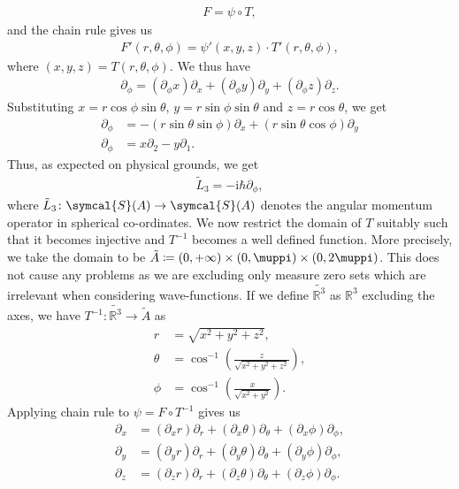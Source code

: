 \documentclass[12pt, a4 paper]{article}
\theoremstyle{definition}
\newcommand{\rthree}{\mathbb{R}^3}
\newcommand{\schwartz}{\symcal{S}}
\renewcommand{\i}{\mathrm{i}}
\renewcommand{\pi}{\muppi}
\begin{document}
	\begin{align*}
		F = \psi \circ T,
	\end{align*}
	and the chain rule gives us
	\begin{align*}
	    F'(r, \theta, \phi) = \psi'(x,y,z) \cdot T'(r, \theta, \phi),
	\end{align*}
	where $(x,y,z) = T(r, \theta, \phi)$. We thus have
	\begin{align*}
	    \partial_\phi = (\partial_\phi x)\partial_x + (\partial_\phi y)\partial_y + (\partial_\phi z)\partial_z.
	\end{align*}
	Substituting $x = r \cos{\phi} \sin{\theta}$, $y = r \sin{\phi} \sin{\theta}$ and $z = r \cos{\theta}$, we get
	\begin{align*}
		\partial_\phi &= -(r \sin{\theta} \sin{\phi})\partial_x + (r \sin{\theta} \cos{\phi})\partial_y\\
		\partial_\phi &= x\partial_2 - y\partial_1.
	\end{align*}
	Thus, as expected on physical grounds, we get
	\begin{align*}
		\tilde{L}_3 = -\i\hbar\partial_\phi,
	\end{align*}
	where $\tilde{L}_3 \colon \schwartz(A) \rightarrow \schwartz(A)$ denotes the angular momentum operator in spherical co-ordinates.
	We now restrict the domain of $T$ suitably such that it becomes injective and $T^{-1}$ becomes a well defined function. More precisely, we take the domain to be $\tilde{A} \coloneq (0, +\infty) \times (0,\pi) \times (0,2\pi)$. This does not cause any problems as we are excluding only measure zero sets which are irrelevant when considering wave-functions. If we define $\tilde{\rthree}$ as $\rthree$ excluding the axes, we have $T^{-1} \colon \tilde{\rthree} \rightarrow \tilde{A}$ as
	\begin{align*}
		r      &= \sqrt{x^2 + y^2 + z^2},\\
		\theta &= \cos^{-1}{\left(\frac{z}{\sqrt{x^2 + y^2 + z^2}}\right)},\\
		\phi   &= \cos^{-1}{\left(\frac{x}{\sqrt{x^2 + y^2}}\right)}.
	\end{align*}
	Applying chain rule to $\psi = F \circ T^{-1}$ gives us
	\begin{align*}
	    \partial_x &= (\partial_x r)\partial_r + (\partial_x \theta)\partial_\theta + (\partial_x \phi)\partial_\phi,\\
		\partial_y &= (\partial_y r)\partial_r + (\partial_y \theta)\partial_\theta + (\partial_y \phi)\partial_\phi,\\
		\partial_z &= (\partial_z r)\partial_r + (\partial_z \theta)\partial_\theta + (\partial_z \phi)\partial_\phi.
	\end{align*}
\end{document}
